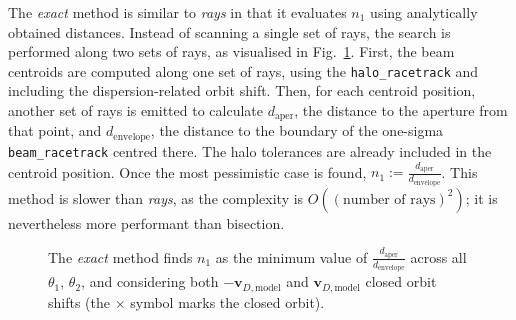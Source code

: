 The \emph{exact} method is similar to \emph{rays} in that it evaluates $n_1$ using analytically obtained distances.
Instead of scanning a single set of rays, the search is performed along two sets of rays, as visualised in Fig.~\ref{fig:aperture-exact}.
First, the beam centroids are computed along one set of rays, using the \verb|halo_racetrack| and including the dispersion-related orbit shift.
Then, for each centroid position, another set of rays is emitted to calculate
$d_\text{aper}$, the distance to the aperture from that point, and $d_\text{envelope}$,
the distance to the boundary of the one-sigma \lstinline{beam_racetrack} centred there.
The halo tolerances are already included in the centroid position.
Once the most pessimistic case is found, $n_1 := \frac{d_\text{aper}}{d_\text{envelope}}$.
This method is slower than \emph{rays}, as the complexity is $O((\text{number of rays})^2)$; it is nevertheless more performant than bisection.

\begin{figure}
	\centering
	\caption{The \emph{exact} method finds $n_1$ as the minimum value of $\frac{d_\text{aper}}{d_\text{envelope}}$ across all $\theta_1$, $\theta_2$, and considering both $-\mathbf{v}_{D,\text{model}}$ and $\mathbf{v}_{D,\text{model}}$ closed orbit shifts (the $\times$ symbol marks the closed orbit).}\label{fig:aperture-exact}
\end{figure}
